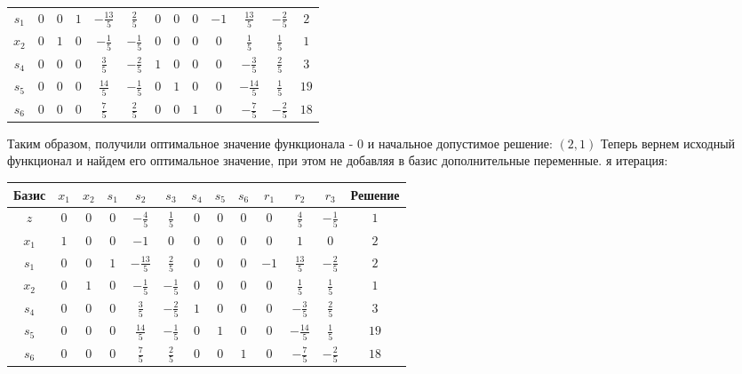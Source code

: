 \documentclass{article}%
\begin{document}
\begin{flushleft}
\begin{tabular}{|c|ccccccccccc|c|}
$s_{1}$&$0$&$0$&$1$&$-\frac{13}{5}$&$\frac{2}{5}$&$0$&$0$&$0$&$-1$&$\frac{13}{5}$&$-\frac{2}{5}$&$2$\\%
$x_{2}$&$0$&$1$&$0$&$-\frac{1}{5}$&$-\frac{1}{5}$&$0$&$0$&$0$&$0$&$\frac{1}{5}$&$\frac{1}{5}$&$1$\\%
$s_{4}$&$0$&$0$&$0$&$\frac{3}{5}$&$-\frac{2}{5}$&$1$&$0$&$0$&$0$&$-\frac{3}{5}$&$\frac{2}{5}$&$3$\\%
$s_{5}$&$0$&$0$&$0$&$\frac{14}{5}$&$-\frac{1}{5}$&$0$&$1$&$0$&$0$&$-\frac{14}{5}$&$\frac{1}{5}$&$19$\\%
$s_{6}$&$0$&$0$&$0$&$\frac{7}{5}$&$\frac{2}{5}$&$0$&$0$&$1$&$0$&$-\frac{7}{5}$&$-\frac{2}{5}$&$18$\\%
\hline%
\end{tabular}%
\newline%
\newline%
Таким образом, получили оптимальное значение функционала {-} 0 и начальное допустимое решение: %
$(2, 1)$%
\newline%
Теперь вернем исходный функционал и найдем его оптимальное значение, при этом не добавляя в базис дополнительные переменные.%
я итерация: %
\newline%
\newline%
\renewcommand{\arraystretch}{1.3}%
\begin{tabular}{|c|ccccccccccc|c|}%
\hline%
Базис&$x_{1}$&$x_{2}$&$s_{1}$&$s_{2}$&$s_{3}$&$s_{4}$&$s_{5}$&$s_{6}$&$r_{1}$&$r_{2}$&$r_{3}$&Решение\\%
\hline%
$z$&$0$&$0$&$0$&$-\frac{4}{5}$&$\frac{1}{5}$&$0$&$0$&$0$&$0$&$\frac{4}{5}$&$-\frac{1}{5}$&$1$\\%
\hline%
$x_{1}$&$1$&$0$&$0$&$-1$&$0$&$0$&$0$&$0$&$0$&$1$&$0$&$2$\\%
$s_{1}$&$0$&$0$&$1$&$-\frac{13}{5}$&$\frac{2}{5}$&$0$&$0$&$0$&$-1$&$\frac{13}{5}$&$-\frac{2}{5}$&$2$\\%
$x_{2}$&$0$&$1$&$0$&$-\frac{1}{5}$&$-\frac{1}{5}$&$0$&$0$&$0$&$0$&$\frac{1}{5}$&$\frac{1}{5}$&$1$\\%
$s_{4}$&$0$&$0$&$0$&$\frac{3}{5}$&$-\frac{2}{5}$&$1$&$0$&$0$&$0$&$-\frac{3}{5}$&$\frac{2}{5}$&$3$\\%
$s_{5}$&$0$&$0$&$0$&$\frac{14}{5}$&$-\frac{1}{5}$&$0$&$1$&$0$&$0$&$-\frac{14}{5}$&$\frac{1}{5}$&$19$\\%
$s_{6}$&$0$&$0$&$0$&$\frac{7}{5}$&$\frac{2}{5}$&$0$&$0$&$1$&$0$&$-\frac{7}{5}$&$-\frac{2}{5}$&$18$\\%
\hline%
\end{tabular}%

\end{flushleft}
\end{document}
